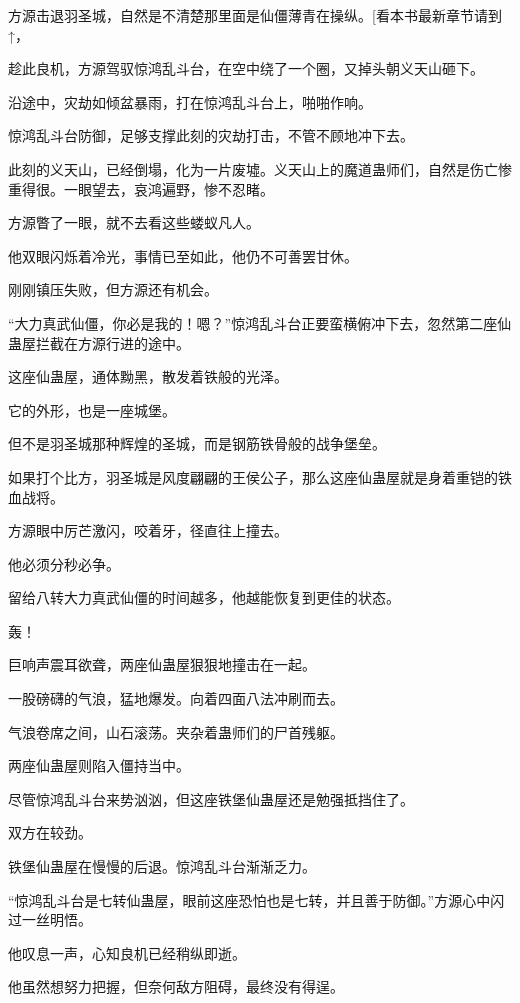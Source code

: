 
\begin{this_body}

方源击退羽圣城，自然是不清楚那里面是仙僵薄青在操纵。[看本书最新章节请到↑，

趁此良机，方源驾驭惊鸿乱斗台，在空中绕了一个圈，又掉头朝义天山砸下。

沿途中，灾劫如倾盆暴雨，打在惊鸿乱斗台上，啪啪作响。

惊鸿乱斗台防御，足够支撑此刻的灾劫打击，不管不顾地冲下去。

此刻的义天山，已经倒塌，化为一片废墟。义天山上的魔道蛊师们，自然是伤亡惨重得很。一眼望去，哀鸿遍野，惨不忍睹。

方源瞥了一眼，就不去看这些蝼蚁凡人。

他双眼闪烁着冷光，事情已至如此，他仍不可善罢甘休。

刚刚镇压失败，但方源还有机会。

“大力真武仙僵，你必是我的！嗯？”惊鸿乱斗台正要蛮横俯冲下去，忽然第二座仙蛊屋拦截在方源行进的途中。

这座仙蛊屋，通体黝黑，散发着铁般的光泽。

它的外形，也是一座城堡。

但不是羽圣城那种辉煌的圣城，而是钢筋铁骨般的战争堡垒。

如果打个比方，羽圣城是风度翩翩的王侯公子，那么这座仙蛊屋就是身着重铠的铁血战将。

方源眼中厉芒激闪，咬着牙，径直往上撞去。

他必须分秒必争。

留给八转大力真武仙僵的时间越多，他越能恢复到更佳的状态。

轰！

巨响声震耳欲聋，两座仙蛊屋狠狠地撞击在一起。

一股磅礴的气浪，猛地爆发。向着四面八法冲刷而去。

气浪卷席之间，山石滚荡。夹杂着蛊师们的尸首残躯。

两座仙蛊屋则陷入僵持当中。

尽管惊鸿乱斗台来势汹汹，但这座铁堡仙蛊屋还是勉强抵挡住了。

双方在较劲。

铁堡仙蛊屋在慢慢的后退。惊鸿乱斗台渐渐乏力。

“惊鸿乱斗台是七转仙蛊屋，眼前这座恐怕也是七转，并且善于防御。”方源心中闪过一丝明悟。

他叹息一声，心知良机已经稍纵即逝。

他虽然想努力把握，但奈何敌方阻碍，最终没有得逞。


\end{this_body}
